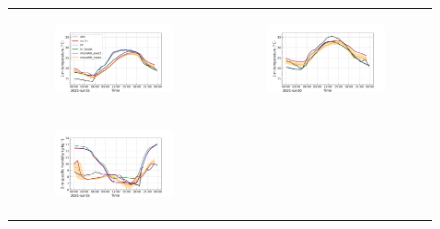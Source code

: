 \begin{figure}[hbtp]
    \centering
    \begin{tabular}{cc}
        \begin{subfigure}[t]{0.5\textwidth}
            \caption{}
            \includegraphics[width=\textwidth]{images/chap6/IOP_TS/TS_2021-07-15_elsplans_t2m.png}
        \end{subfigure} &
        \begin{subfigure}[t]{0.5\textwidth}
            \caption{}
            \includegraphics[width=\textwidth]{images/chap6/IOP_TS/TS_2021-07-20_elsplans_t2m.png}
        \end{subfigure} \\
        \begin{subfigure}[t]{0.5\textwidth}
            \caption{}
            \includegraphics[width=\textwidth]{images/chap6/IOP_TS/TS_2021-07-15_elsplans_q2m.png}

\end{subfigure}
\end{tabular}
\end{figure}
